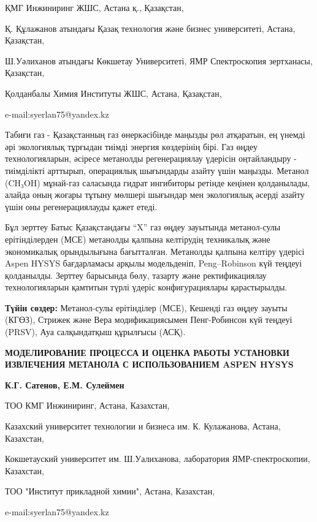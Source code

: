 \begin{affil}
ҚМГ Инжиниринг ЖШС, Астана қ., Қазақстан,

Қ. Құлажанов атындағы Қазақ технология және бизнес университеті, Астана, Қазақстан,

Ш.Уәлиханов атындағы Көкшетау Университеті, ЯМР Спектроскопия зертханасы, Қазақстан,

Қолданбалы Химия Институты ЖШС, Астана, Қазақстан,

e-mail:syerlan75@yandex.kz
\end{affil}

Табиғи газ - Қазақстанның газ өнеркәсібінде маңызды рөл атқаратын, ең
үнемді әрі экологиялық тұрғыдан тиімді энергия көздерінің бірі. Газ
өңдеу технологияларын, әсіресе метанолды регенерациялау үдерісін
оңтайландыру - тиімділікті арттырып, операциялық шығындарды азайту үшін
маңызды. Метанол (CH₃OH) мұнай-газ саласында гидрат ингибиторы ретінде
кеңінен қолданылады, алайда оның жоғары тұтыну мөлшері шығындар мен
экологиялық әсерді азайту үшін оны регенерациялауды қажет етеді.

Бұл зерттеу Батыс Қазақстандағы ``X'' газ өңдеу зауытында метанол-сулы
ерітінділерден (МСЕ) метанолды қалпына келтірудің техникалық және
экономикалық орындылығына бағытталған. Метанолды қалпына келтіру үдерісі
Aspen HYSYS бағдарламасы арқылы модельденіп, Peng--Robinson күй теңдеуі
қолданылды. Зерттеу барысында бөлу, тазарту және ректификациялау
технологияларын қамтитын түрлі үдеріс конфигурациялары қарастырылды.

{\bfseries Түйін сөздер:} Метанол-сулы ерітінділер (МСЕ), Кешенді газ өңдеу
зауыты (КГӨЗ), Стрижек және Вера модификациясымен Пенг-Робинсон күй
теңдеуі (PRSV), Ауа салқындатқыш құрылғысы (АСҚ).

\begin{header}
{\bfseries МОДЕЛИРОВАНИЕ ПРОЦЕССА И ОЦЕНКА РАБОТЫ УСТАНОВКИ ИЗВЛЕЧЕНИЯ
МЕТАНОЛА С ИСПОЛЬЗОВАНИЕМ ASPEN HYSYS}

{\bfseries
{}К.Г. Сатенов,
Е.М. Сулеймен\envelope
}
\end{header}

\begin{affil}
ТОО КМГ Инжиниринг, Астана, Казахстан,

Казахский университет технологии и бизнеса им. К. Кулажанова, Астана, Казахстан,

Кокшетауский университет им. Ш.Уалиханова, лаборатория ЯМР-спектроскопии, Казахстан,

ТОО "Институт прикладной химии", Астана, Казахстан,

e-mail:syerlan75@yandex.kz
\end{affil}

